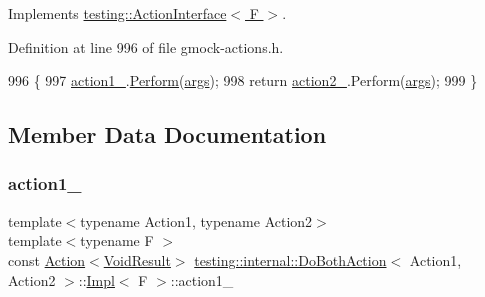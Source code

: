 Implements \hyperlink{classtesting_1_1ActionInterface_a20f8624fcea1786f2992b358760422a0}{testing\+::\+Action\+Interface$<$ F $>$}.



Definition at line 996 of file gmock-\/actions.\+h.


\begin{DoxyCode}
996                                                       \{
997       \hyperlink{classtesting_1_1internal_1_1DoBothAction_1_1Impl_af54fe7ce6f362c7ecae828804d18039a}{action1\_}.\hyperlink{classtesting_1_1Action_ad00a03062885685da84b308e6e8ff4cb}{Perform}(\hyperlink{namespacegenerate__debs_a75f9143e38df82d83b2e8a6f99cae02c}{args});
998       \textcolor{keywordflow}{return} \hyperlink{classtesting_1_1internal_1_1DoBothAction_1_1Impl_af1f725e8d028c532c07ee606df35dc44}{action2\_}.Perform(\hyperlink{namespacegenerate__debs_a75f9143e38df82d83b2e8a6f99cae02c}{args});
999     \}
\end{DoxyCode}


\subsection{Member Data Documentation}
\mbox{\label{classtesting_1_1internal_1_1DoBothAction_1_1Impl_af54fe7ce6f362c7ecae828804d18039a}} 
\subsubsection{\texorpdfstring{action1\+\_\+}{action1\_}}
{\footnotesize\ttfamily template$<$typename Action1, typename Action2$>$ \\
template$<$typename F $>$ \\
const \hyperlink{classtesting_1_1Action}{Action}$<$\hyperlink{classtesting_1_1internal_1_1DoBothAction_1_1Impl_a83909f0d1addcd1207ff45b128f33802}{Void\+Result}$>$ \hyperlink{classtesting_1_1internal_1_1DoBothAction}{testing\+::internal\+::\+Do\+Both\+Action}$<$ Action1, Action2 $>$\+::\hyperlink{classtesting_1_1internal_1_1DoBothAction_1_1Impl}{Impl}$<$ F $>$\+::action1\+\_\+\hspace{0.3cm}{\ttfamily [private]}}




